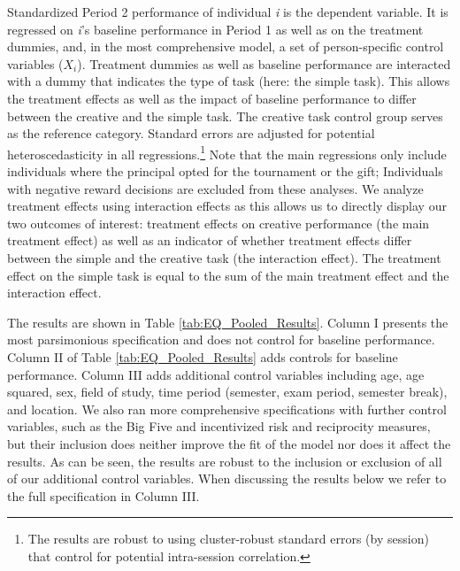 Standardized  Period 2 performance of individual \textit{i} is the dependent variable. It is regressed on \textit{i}'s baseline performance in Period 1 as well as on the treatment dummies, and, in the most comprehensive model, a set of person-specific control variables ($X_{i}$). Treatment dummies as well as baseline performance are interacted with a dummy that indicates the type of task (here: the simple task). This allows the treatment effects as well as the impact of baseline performance to differ between the creative and the simple task. The  creative task control group  serves as the reference category. Standard errors are adjusted for potential heteroscedasticity in all regressions.\footnote{The results are robust to using cluster-robust standard errors (by session) that control for potential intra-session correlation.} Note that the main regressions only include individuals where the principal opted for the tournament or the gift; Individuals with negative reward decisions are excluded from these analyses.  We analyze treatment effects using interaction effects as this allows us to directly display our two outcomes of interest: treatment effects on creative performance (the main treatment effect) as well as an indicator of whether treatment effects differ between the simple and the creative task (the interaction effect). The treatment effect on the simple task is equal to the sum of the main treatment effect and the interaction effect. 

The results are shown in Table \ref{tab:EQ_Pooled_Results}.  Column I presents the most parsimonious specification and does not control for baseline performance. Column II of Table \ref{tab:EQ_Pooled_Results} adds controls for baseline performance. Column III adds additional control variables including age, age squared, sex, field of study, time period (semester, exam period, semester break), and location. 
We also ran more comprehensive specifications with further control variables, such as the Big Five and incentivized risk and reciprocity measures, but their inclusion does neither improve the fit of the model nor does it affect the results. As can be seen, the results are robust to the inclusion or exclusion of all of our additional control variables. When discussing the results below we refer to the full specification in Column III.  

